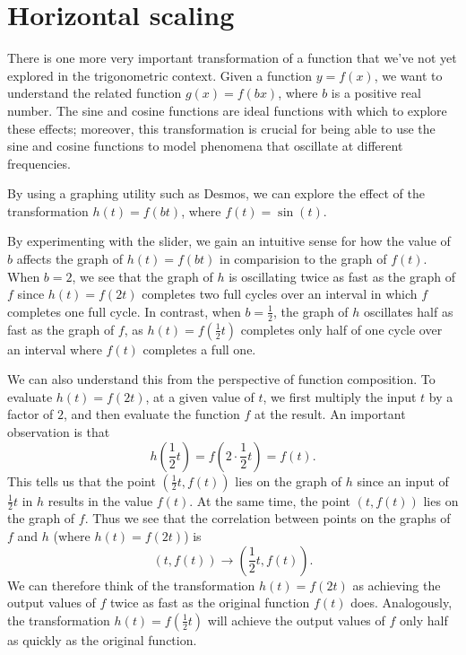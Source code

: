 \documentclass{ximera}
\begin{document}
\section{Horizontal scaling}

There is one more very important transformation of a function that we've not yet explored in the trigonometric context.  Given a function \(y = f(x)\), we want to understand the related function \(g(x) = f(bx)\), where \(b\) is a positive real number.  The sine and cosine functions are ideal functions with which to explore these effects; moreover, this transformation is crucial for being able to use the sine and cosine functions to model phenomena that oscillate at different frequencies.%

By using a graphing utility such as Desmos, we can explore the effect of the transformation \(h(t) = f(bt)\), where \(f(t) = \sin(t)\).%

\begin{center}  
\end{center}

By experimenting with the slider, we gain an intuitive sense for how the value of \(b\) affects the graph of \(h(t) = f(bt)\) in comparision to the graph of \(f(t)\).  When \(b = 2\), we see that the graph of \(h\) is oscillating twice as fast as the graph of \(f\) since \(h(t) = f(2t)\) completes two full cycles over an interval in which \(f\) completes one full cycle.  In contrast, when \(b = \frac{1}{2}\), the graph of \(h\) oscillates half as fast as the graph of \(f\), as \(h(t) = f\left(\frac{1}{2}t\right)\) completes only half of one cycle over an interval where \(f(t)\) completes a full one.%

We can also understand this from the perspective of function composition.  To evaluate \(h(t) = f(2t)\), at a given value of \(t\), we first multiply the input \(t\) by a factor of \(2\), and then evaluate the function \(f\) at the result.  An important observation is that%
\[
h\left( \frac{1}{2}t \right) = f\left( 2 \cdot \frac{1}{2}t \right) = f(t)\text{.}
\]
This tells us that the point \(\left(\frac{1}{2}t, f(t)\right)\) lies on the graph of \(h\) since an input of \(\frac{1}{2}t\) in \(h\) results in the value \(f(t)\).  At the same time, the point \((t,f(t))\) lies on the graph of \(f\).  Thus we see that the correlation between points on the graphs of \(f\) and \(h\) (where \(h(t) = f(2t)\)) is%
\[
(t, f(t)) \rightarrow \left( \frac{1}{2}t, f(t) \right)\text{.}
\]
We can therefore think of the transformation \(h(t) = f(2t)\) as achieving the output values of \(f\) twice as fast as the original function \(f(t)\) does.  Analogously, the transformation \(h(t) = f\left(\frac{1}{2}t\right)\) will achieve the output values of \(f\) only half as quickly as the original function.%
\end{document}
